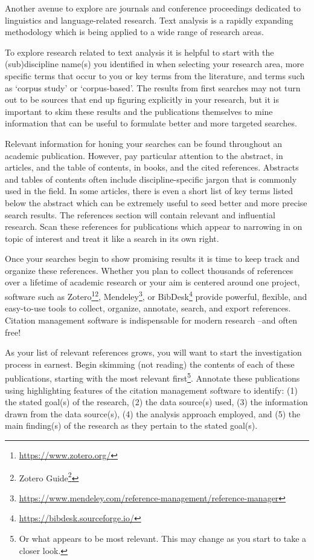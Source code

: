 \documentclass[
  letterpaper,
  DIV=11,
  numbers=noendperiod]{scrreprt}
\theoremstyle{definition}
\theoremstyle{remark}
\DeclareRobustCommand{\href}[2]{#2\footnote{\url{#1}}}
\begin{document}
Another avenue to explore are journals and conference proceedings
dedicated to linguistics and language-related research. Text analysis is
a rapidly expanding methodology which is being applied to a wide range
of research areas.

To explore research related to text analysis it is helpful to start with
the (sub)discipline name(s) you identified in when selecting your
research area, more specific terms that occur to you or key terms from
the literature, and terms such as `corpus study' or `corpus-based'. The
results from first searches may not turn out to be sources that end up
figuring explicitly in your research, but it is important to skim these
results and the publications themselves to mine information that can be
useful to formulate better and more targeted searches.

Relevant information for honing your searches can be found throughout an
academic publication. However, pay particular attention to the abstract,
in articles, and the table of contents, in books, and the cited
references. Abstracts and tables of contents often include
discipline-specific jargon that is commonly used in the field. In some
articles, there is even a short list of key terms listed below the
abstract which can be extremely useful to seed better and more precise
search results. The references section will contain relevant and
influential research. Scan these references for publications which
appear to narrowing in on topic of interest and treat it like a search
in its own right.

Once your searches begin to show promising results it is time to keep
track and organize these references. Whether you plan to collect
thousands of references over a lifetime of academic research or your aim
is centered around one project, software such as
\href{https://www.zotero.org/}{Zotero}\footnote{\href{https://guides.zsr.wfu.edu/zotero}{Zotero
  Guide}},
\href{https://www.mendeley.com/reference-management/reference-manager}{Mendeley},
or \href{https://bibdesk.sourceforge.io/}{BibDesk} provide powerful,
flexible, and easy-to-use tools to collect, organize, annotate, search,
and export references. Citation management software is indispensable for
modern research --and often free!

As your list of relevant references grows, you will want to start the
investigation process in earnest. Begin skimming (not reading) the
contents of each of these publications, starting with the most relevant
first\footnote{Or what appears to be most relevant. This may change as
  you start to take a closer look.}. Annotate these publications using
highlighting features of the citation management software to identify:
(1) the stated goal(s) of the research, (2) the data source(s) used, (3)
the information drawn from the data source(s), (4) the analysis approach
employed, and (5) the main finding(s) of the research as they pertain to
the stated goal(s).
\end{document}
